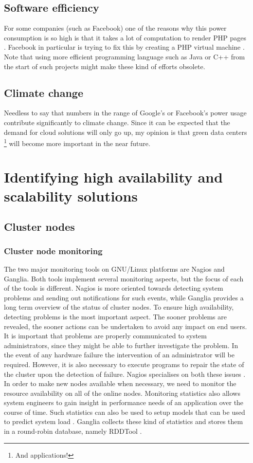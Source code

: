 \documentclass[12pt]{report}
\begin{document}
\section{Software efficiency}
For some companies (such as Facebook) one of the reasons why this
power consumption is so high is that it takes a lot of computation to
render PHP pages \cite{facebook_php}. Facebook in particular is trying
to fix this by creating a PHP virtual machine \cite{php_vm}.\\
Note that using more efficient programming language such as Java or C++ 
from the start of such projects might make these kind of efforts
obsolete.

\section{Climate change}
Needless to say that numbers in the range of Google's or Facebook's
power usage contribute significantly to climate change. Since it can
be expected that the demand for cloud solutions will only go up, my
opinion is that green data centers \footnote{And applications!} will become more
important in the near future.\\

\chapter{Identifying high availability and scalability solutions}
\section{Cluster nodes}
\subsection{Cluster node monitoring}
The two major monitoring tools on GNU/Linux platforms are Nagios and
Ganglia. Both tools implement several monitoring aspects, but the
focus of each of the tools is different. Nagios is more oriented
towards detecting system problems and sending out notifications for
such events, while Ganglia provides a long term overview of the status
of cluster nodes. To ensure high availability, detecting problems is
the most important aspect. The sooner problems are revealed, the
sooner actions can be undertaken to avoid any impact on end users. It
is important that problems are properly communicated to system
administrators, since they might be able to further investigate the
problem. In the event of any hardware failure the intervention of
an administrator will be required. However, it is also necessary to
execute programs to repair the state of the cluster
 upon the detection of failure. Nagios specialises on both these
 issues \cite{nagios:2013}.
In order to make new nodes available when necessary, we need to
monitor the resource availability on all of the online nodes.
Monitoring statistics also allows system engineers to gain insight in
performance needs of an application over the course of time. 
Such statistics can also be used to setup models that can be used to
predict system load \cite{andreolini:2006}. Ganglia collects these
kind of statistics and stores them in a round-robin database, namely RDDTool
\cite{ganglia:2013} \cite{rrdt:2013}.
\end{document}
